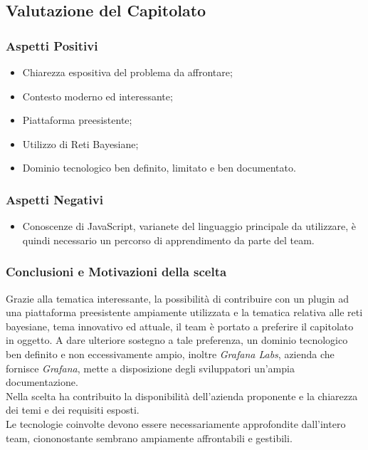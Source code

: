 \subsection{Valutazione del Capitolato}
\subsubsection{Aspetti Positivi}
\begin{itemize}
	\item Chiarezza espositiva del problema da affrontare;
	\item Contesto moderno ed interessante;
	\item Piattaforma preesistente;
	\item Utilizzo di Reti Bayesiane;
	\item Dominio tecnologico ben definito, limitato e ben documentato.
\end{itemize}

\subsubsection{Aspetti Negativi}
\begin{itemize}
	\item Conoscenze di JavaScript, varianete del linguaggio principale da utilizzare,  è quindi necessario un percorso di apprendimento da parte del team.
\end{itemize}

\subsubsection{Conclusioni e Motivazioni della scelta}
Grazie alla tematica interessante, la possibilità di contribuire con un plugin ad una piattaforma preesistente ampiamente utilizzata e la tematica relativa alle reti bayesiane, tema innovativo ed attuale, il team è portato a preferire il capitolato in oggetto. A dare ulteriore sostegno a tale preferenza, un dominio tecnologico ben definito e non eccessivamente ampio, inoltre \textit{Grafana Labs}, azienda che fornisce \textit{Grafana}, mette a disposizione degli sviluppatori un'ampia documentazione.\\
 Nella scelta ha contribuito la disponibilità dell'azienda proponente e la chiarezza dei temi e dei requisiti esposti.\\
Le tecnologie coinvolte devono essere necessariamente approfondite dall'intero team, ciononostante sembrano  ampiamente affrontabili e gestibili.
